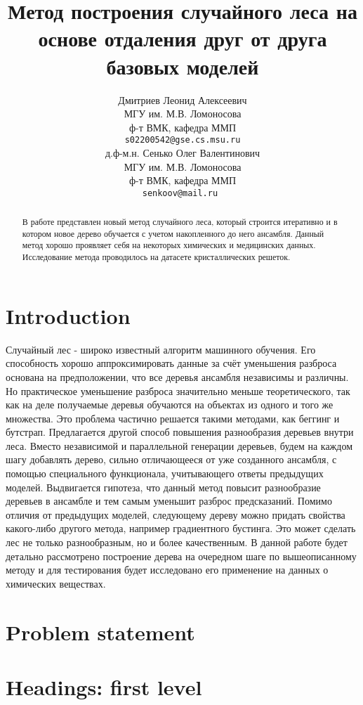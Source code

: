\documentclass{article}
\title{Метод построения случайного леса на основе отдаления друг от друга базовых моделей}
\author{ Дмитриев Леонид Алексеевич  \\
	МГУ им. М.В. Ломоносова\\
	ф-т ВМК, кафедра ММП\\
	\texttt{s02200542@gse.cs.msu.ru} \\
	\And
	д.ф-м.н. Сенько Олег Валентинович \\
	МГУ им. М.В. Ломоносова\\
	ф-т ВМК, кафедра ММП\\
	\texttt{senkoov@mail.ru } \\
}
\date{}
\begin{document}
\maketitle

\begin{abstract}
	В работе представлен новый метод случайного леса, который строится итеративно и в котором новое дерево обучается с учетом накопленного до него ансамбля. Данный метод хорошо проявляет себя на некоторых химических и медицинских данных. Исследование метода проводилось на датасете кристаллических решеток.
\end{abstract}



\section{Introduction}

Случайный лес - широко известный алгоритм машинного обучения.
Его способность хорошо аппроксимировать данные за счёт
уменьшения разброса основана на предположении, что все деревья
ансамбля независимы и различны. Но практическое уменьшение
разброса значительно меньше теоретического, так как на деле
получаемые деревья обучаются на объектах из одного и того же
множества. Это проблема частично решается такими методами, как
беггинг и бутстрап.
Предлагается другой способ повышения разнообразия деревьев
внутри леса. Вместо независимой и параллельной генерации деревьев,
будем на каждом шагу добавлять дерево, сильно отличающееся от уже
созданного ансамбля, с помощью специального функционала,
учитывающего ответы предыдущих моделей. Выдвигается гипотеза,
что данный метод повысит разнообразие деревьев в ансамбле и тем
самым уменьшит разброс предсказаний.
Помимо отличия от предыдущих моделей, следующему дереву можно
придать свойства какого-либо другого метода, например градиентного
бустинга. Это может сделать лес не только разнообразным, но и более
качественным.
В данной работе будет детально рассмотрено построение дерева на
очередном шаге по вышеописанному методу и для тестирования будет
исследовано его применение на данных о химических веществах.

\section{Problem statement}
\label{sec:headings}

\section{Headings: first level}
\label{sec:headings}
\end{document}
